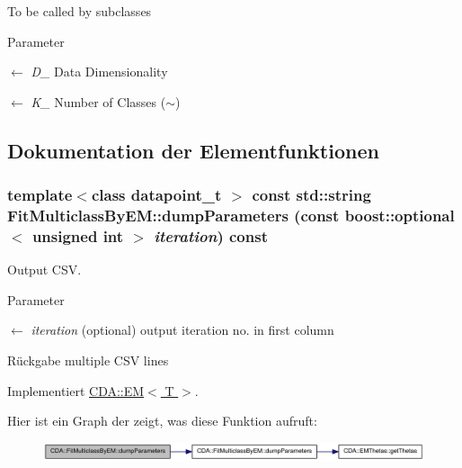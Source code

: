 To be called by subclasses


\begin{DoxyParams}{Parameter}
\item[\mbox{$\leftarrow$} {\em D\_\-}]Data Dimensionality \item[\mbox{$\leftarrow$} {\em K\_\-}]Number of Classes ($\sim$) \end{DoxyParams}


\subsection{Dokumentation der Elementfunktionen}
\hypertarget{classCDA_1_1FitMulticlassByEM_abd04a7135250a427a100c95bf2bf43a9}{
\subsubsection[{dumpParameters}]{\setlength{\rightskip}{0pt plus 5cm}template$<$class datapoint\_\-t $>$ const std::string FitMulticlassByEM::dumpParameters (const boost::optional$<$ unsigned int $>$ {\em iteration}) const}}
\label{classCDA_1_1FitMulticlassByEM_abd04a7135250a427a100c95bf2bf43a9}


Output CSV. 


\begin{DoxyParams}{Parameter}
\item[\mbox{$\leftarrow$} {\em iteration}](optional) output iteration no. in first column\end{DoxyParams}
\begin{DoxyReturn}{Rückgabe}
multiple CSV lines 
\end{DoxyReturn}


Implementiert \hyperlink{classCDA_1_1EM_ad2655bd878821e73ba18beff576a2b4a}{CDA::EM$<$ T $>$}.



Hier ist ein Graph der zeigt, was diese Funktion aufruft:\nopagebreak
\begin{figure}[H]
\begin{center}
\leavevmode
\includegraphics[width=330pt]{classCDA_1_1FitMulticlassByEM_abd04a7135250a427a100c95bf2bf43a9_cgraph}
\end{center}
\end{figure}


